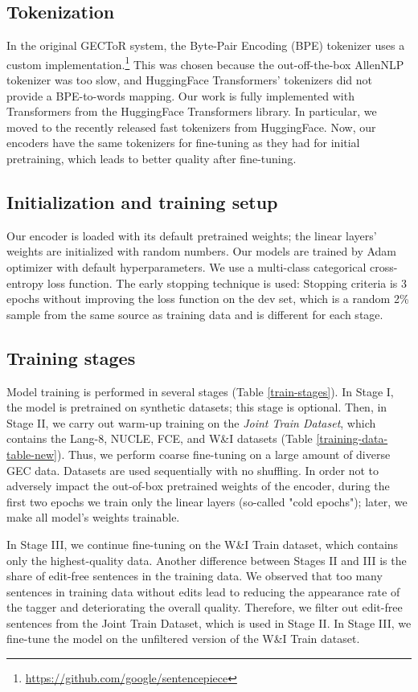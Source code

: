 \documentclass[11pt]{article}
\begin{document}
\subsection{Tokenization} In the original GECToR system, the Byte-Pair Encoding (BPE) tokenizer \cite{sennrich-etal-2016-neural} uses a custom implementation.\footnote{\url{https://github.com/google/sentencepiece}} This was chosen because the out-off-the-box AllenNLP tokenizer was too slow, and HuggingFace Transformers' tokenizers did not provide a BPE-to-words mapping. Our work is fully implemented with Transformers from the HuggingFace Transformers library. In particular, we moved to the recently released fast tokenizers from HuggingFace. Now, our encoders have the same tokenizers for fine-tuning as they had for initial pretraining, which leads to better quality after fine-tuning.

\subsection{Initialization and training setup} Our encoder is loaded with its default pretrained weights; the linear layers' weights are initialized with random numbers. Our models are trained by Adam optimizer \cite{kingma1412adam} with default hyperparameters. We use a multi-class categorical cross-entropy loss function. The early stopping technique is used: Stopping criteria is 3 epochs without improving the loss function on the dev set, which is a random 2\% sample from the same source as training data and is different for each stage.


\subsection{Training stages} Model training is performed in several stages (Table \ref{train-stages}). In Stage I, the model is pretrained on synthetic datasets; this stage is optional. Then, in Stage II, we carry out warm-up training on the \textit{Joint Train Dataset}, which contains the Lang-8, NUCLE, FCE, and W\&I datasets (Table \ref{training-data-table-new}). Thus, we perform coarse fine-tuning on a large amount of diverse GEC data. Datasets are used sequentially with no shuffling. In order not to adversely impact the out-of-box pretrained weights of the encoder, during the first two epochs we train only the linear layers (so-called "cold epochs"); later, we make all model's weights trainable. 

In Stage III, we continue fine-tuning on the W\&I Train dataset, which contains only the highest-quality data. Another difference between Stages II and III is the share of edit-free sentences in the training data. We observed that too many sentences in training data without edits lead to reducing the appearance rate of the tagger and deteriorating the overall quality. Therefore, we filter out edit-free sentences from the Joint Train Dataset, which is used in Stage II. In Stage III, we fine-tune the model on the unfiltered version of the W\&I Train dataset. 
\end{document}
